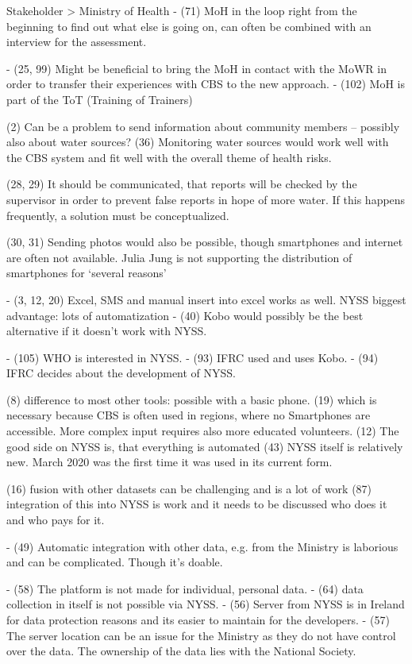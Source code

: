Stakeholder > Ministry of Health
-	(71) MoH in the loop right from the beginning to find out what else is going on, can often be combined with an interview for the assessment.

-	(25, 99) Might be beneficial to bring the MoH in contact with the MoWR in order to transfer their experiences with CBS to the new approach.
-	(102) MoH is part of the ToT (Training of Trainers)

(2) Can be a problem to send information about community members – possibly also about water sources? 
(36) Monitoring water sources would work well with the CBS system and fit well with the overall theme of health risks.

(28, 29) It should be communicated, that reports will be checked by the supervisor in order to prevent false reports in hope of more water. If this happens frequently, a solution must be conceptualized.

(30, 31) Sending photos would also be possible, though smartphones and internet are often not available. Julia Jung is not supporting the distribution of smartphones for ‘several reasons’

-	(3, 12, 20) Excel, SMS and manual insert into excel works as well. NYSS biggest advantage: lots of automatization
-	(40) Kobo would possibly be the best alternative if it doesn’t work with NYSS.

-	(105) WHO is interested in NYSS.
-	(93) IFRC used and uses Kobo.
-	(94) IFRC decides about the development of NYSS.

(8) difference to most other tools: possible with a basic phone. (19) which is necessary because CBS is often used in regions, where no Smartphones are accessible. More complex input requires also more educated volunteers.
(12) The good side on NYSS is, that everything is automated
(43) NYSS itself is relatively new. March 2020 was the first time it was used in its current form.

(16) fusion with other datasets can be challenging and is a lot of work
(87) integration of this into NYSS is work and it needs to be discussed who does it and who pays for it.

-	(49) Automatic integration with other data, e.g. from the Ministry is laborious and can be complicated. Though it’s doable.

-	(58) The platform is not made for individual, personal data.
-	(64) data collection in itself is not possible via NYSS.
-	(56) Server from NYSS is in Ireland for data protection reasons and its easier to maintain for the developers.
-	(57) The server location can be an issue for the Ministry as they do not have control over the data. The ownership of the data lies with the National Society. 



